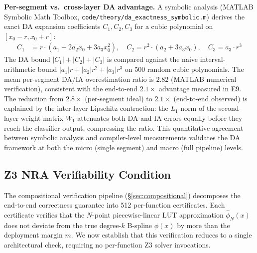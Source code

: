 \vspace{4pt}
\noindent\textbf{Per-segment vs.\ cross-layer DA advantage.}
A symbolic analysis (MATLAB Symbolic Math Toolbox,
\texttt{code/theory/\allowbreak{}da\_exactness\_symbolic.m}) derives the exact DA
expansion coefficients $C_1, C_2, C_3$ for a cubic polynomial on
$[x_0-r, x_0+r]$:
\begin{align}
C_1 &= r \cdot (a_1 + 2a_2 x_0 + 3a_3 x_0^2), \quad
C_2 = r^2 \cdot (a_2 + 3a_3 x_0), \quad
C_3 = a_3 \cdot r^3 \label{eq:da_C123}
\end{align}
The DA bound $|C_1| + |C_2| + |C_3|$ is compared against the naive
interval-arithmetic bound $|a_1|r + |a_2| r^2 + |a_3| r^3$ on 500
random cubic polynomials. The mean per-segment DA/IA overestimation
ratio is $2.82$ (MATLAB numerical verification), consistent with the
end-to-end $2.1\times$ advantage measured in E9. The reduction from
$2.8\times$ (per-segment ideal) to $2.1\times$ (end-to-end observed)
is explained by the inter-layer Lipschitz contraction: the $L_1$-norm
of the second-layer weight matrix $W_1$ attenuates both DA and IA
errors equally before they reach the classifier output, compressing
the ratio. This quantitative agreement between symbolic analysis
and compiler-level measurements validates the DA framework at both
the micro (single segment) and macro (full pipeline) levels.

\subsection{Z3 NRA Verifiability Condition}
\label{sec:z3-verifiability}

The compositional verification pipeline ({\S}\ref{sec:compositional})
decomposes the end-to-end correctness guarantee into 512 per-function
certificates. Each certificate verifies that the $N$-point piecewise-linear
LUT approximation $\hat{\phi}_N(x)$ does not deviate from the true degree-$k$
B-spline $\phi(x)$ by more than the deployment margin $m$. We now establish
that this verification reduces to a single architectural check, requiring no
per-function Z3 solver invocations.


